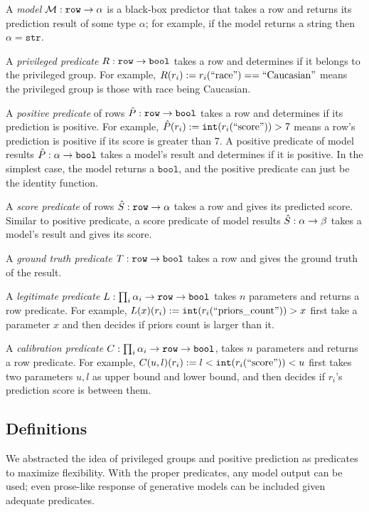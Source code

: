 \documentclass[conference]{IEEEtran}
\begin{document}
A \emph{model} $\mathcal{M} : \mathtt{row} \rightarrow \alpha$ is a black-box predictor that takes a row and returns its prediction result of some type $\alpha$; for example, if the model returns a string then $\alpha = \mathtt{str}$.

A \emph{privileged predicate} $R : \mathtt{row} \rightarrow \mathtt{bool}$ takes a row and determines if it belongs to the privileged group. For example, $R(r_i) := r_i(\text{``race''}) == \text{``Caucasian''}$ means the privileged group is those with race being Caucasian.

A \emph{positive predicate} of rows $\hat{P} : \mathtt{row} \rightarrow \mathtt{bool}$ takes a row and determines if its prediction is positive. For example, $\hat{P}(r_i) := \mathtt{int}(r_i(\text{``score''})) > 7$ means a row's prediction is positive if its score is greater than 7. A positive predicate of model results $\hat{P} : \alpha \rightarrow \mathtt{bool}$ takes a model's result and determines if it is positive. In the simplest case, the model returns a $\mathtt{bool}$, and the positive predicate can just be the identity function.

A \emph{score predicate} of rows $\hat{S} : \mathtt{row} \rightarrow \alpha$ takes a row and gives its predicted score. Similar to positive predicate, a score predicate of model results $\hat{S} : \alpha \rightarrow \beta$ takes a model's result and gives its score.

A \emph{ground truth predicate} $T : \mathtt{row} \rightarrow \mathtt{bool}$ takes a row and gives the ground truth of the result.

A \emph{legitimate predicate} $L : \prod_i \alpha_i \rightarrow \mathtt{row} \rightarrow \mathtt{bool}$ takes $n$ parameters and returns a row predicate. For example, $L(x)(r_i) := \mathtt{int}(r_i(\text{``priors\_count''})) > x$ first take a parameter $x$ and then decides if priors count is larger than it.

A \emph{calibration predicate} $C : \prod_i \alpha_i \rightarrow \mathtt{row} \rightarrow \mathtt{bool}$, takes $n$ parameters and returns a row predicate. For example, $C(u, l)(r_i) := l < \mathtt{int}(r_i(\text{``score''})) < u$ first takes two parameters $u,l$ as upper bound and lower bound, and then decides if $r_i$'s prediction score is between them.

\subsection{Definitions}
We abstracted the idea of privileged groups and positive prediction as predicates to maximize flexibility. With the proper predicates, any model output can be used; even prose-like response of generative models can be included given adequate predicates.
\end{document}

